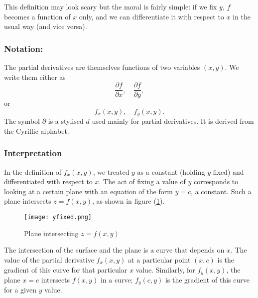   This definition may look scary but the moral is fairly simple: if we fix $y$, $f$ becomes a function of $x$ only, and we can differentiate it with respect to $x$ in the usual way (and vice versa).

  \subsubsection*{Notation:}
  The partial derivatives are themselves functions of two variables $(x, y)$.  We write them either as
    \[
      \frac{\partial f}{\partial x}, \quad \frac{\partial f}{\partial y},
    \]
  or
    \[
      f_x(x, y), \quad f_y(x, y).
    \]
  The symbol $\partial$ is a stylised $d$ used mainly for partial derivatives.  It is derived from the Cyrillic alphabet.

  \subsubsection*{Interpretation}

  In the definition of $f_x(x, y)$, we treated $y$ as a constant (holding $y$ fixed) and differentiated with respect to $x$.  The act of fixing a value of $y$ corresponds to looking at a certain plane with an equation of the form $y = c$, a constant.  Such a plane intersects $z = f(x, y)$, as shown in figure (\ref{yfixed}).
  \begin{figure}[H]
    \centering
    \texttt{[image: yfixed.png]}
    \caption{Plane intersecting $z = f(x, y)$}
    \label{yfixed}
  \end{figure}

  The intersection of the surface and the plane is a curve that depends on $x$.  The value of the partial derivative $f_x(x, y)$ at a particular point $(x, c)$ is the gradient of this curve for that particular $x$ value.  Similarly, for $f_y(x, y)$, the plane $x = c$ intersects $f(x, y)$ in a curve; $f_y(c, y)$ is the gradient of this curve for a given $y$ value.

